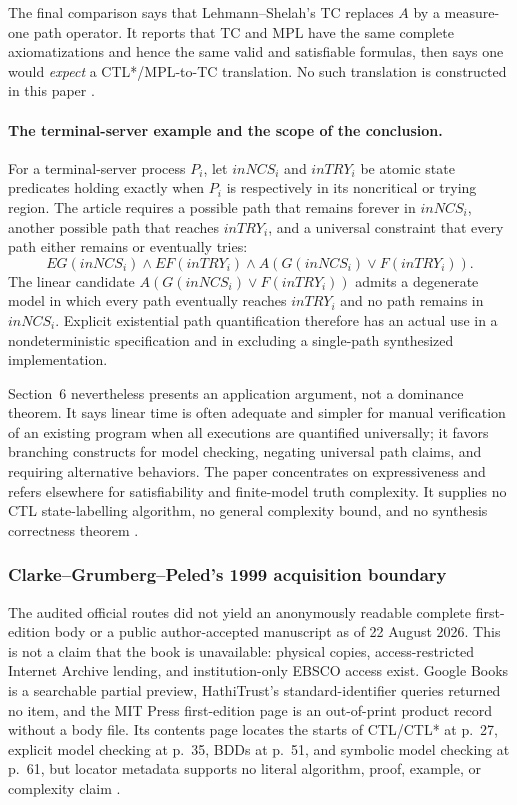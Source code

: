 The final comparison says that Lehmann--Shelah's TC replaces \(A\) by a
measure-one path operator.  It reports that TC and MPL have the same complete
axiomatizations and hence the same valid and satisfiable formulas, then says
one would \emph{expect} a CTL*/MPL-to-TC translation.  No such translation
is constructed in this paper
\cite[pp.~165--166, 176--177]{EmersonHalpern1986}.

\paragraph{The terminal-server example and the scope of the conclusion.}
For a terminal-server process \(P_i\), let \(\mathit{inNCS}_i\) and
\(\mathit{inTRY}_i\) be atomic state predicates holding exactly when
\(P_i\) is respectively in its noncritical or trying region.  The article
requires a possible path that remains forever in \(\mathit{inNCS}_i\), another
possible path that reaches \(\mathit{inTRY}_i\), and a universal constraint
that every path either remains or eventually tries:
\[
 EG(\mathit{inNCS}_i)\land EF(\mathit{inTRY}_i)\land
 A(G(\mathit{inNCS}_i)\lor F(\mathit{inTRY}_i)).
\]
The linear candidate
\(A(G(\mathit{inNCS}_i)\lor F(\mathit{inTRY}_i))\) admits a degenerate
model in which every path eventually reaches \(\mathit{inTRY}_i\) and no path
remains in \(\mathit{inNCS}_i\).  Explicit existential path quantification
therefore has an actual use in a nondeterministic specification and in excluding a
single-path synthesized implementation.

Section~6 nevertheless presents an application argument, not a dominance
theorem.  It says linear time is often adequate and simpler for manual
verification of an existing program when all executions are quantified
universally; it favors branching constructs for model checking, negating
universal path claims, and requiring alternative behaviors.  The paper
concentrates on expressiveness and refers elsewhere for satisfiability and
finite-model truth complexity.  It supplies no CTL state-labelling
algorithm, no general complexity bound, and no synthesis correctness theorem
\cite[pp.~166--167]{EmersonHalpern1986}.

\subsubsection{Clarke--Grumberg--Peled's 1999 acquisition boundary}
\label{sec:p09-presentation-n-c-016-clarke-grumberg-peled}

The audited official routes did not yield an anonymously readable complete
first-edition body or a public author-accepted manuscript as of 22 August
2026.  This is not a claim that the book is unavailable: physical copies,
access-restricted Internet Archive lending, and institution-only EBSCO access
exist.  Google Books is a searchable partial preview, HathiTrust's
standard-identifier queries returned no item, and the MIT Press first-edition
page is an out-of-print product record without a body file.  Its contents page
locates the starts of CTL/CTL* at p.~27, explicit model checking at p.~35,
BDDs at p.~51, and symbolic model checking at p.~61, but locator metadata
supports no literal algorithm, proof, example, or complexity claim
\cite{ClarkeGrumbergPeled1999}.

